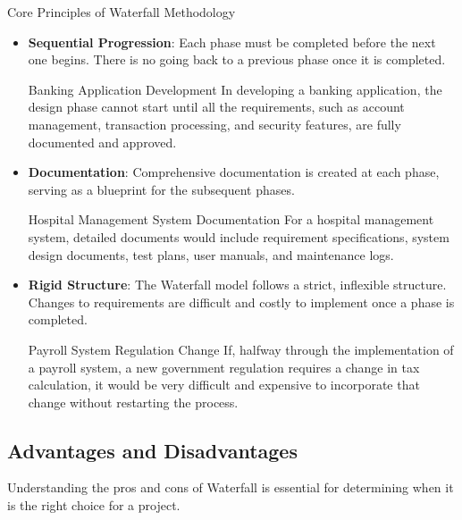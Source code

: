 \begin{conceptcard}{Core Principles of Waterfall Methodology}
  \begin{itemize}
    \item \textbf{Sequential Progression}: Each phase must be completed before the next one begins. There is no going back to a previous phase once it is completed.

          \begin{examplecard}{Banking Application Development}
            In developing a banking application, the design phase cannot start until all the requirements, such as account management, transaction processing, and security features, are fully documented and approved.
          \end{examplecard}

    \item \textbf{Documentation}: Comprehensive documentation is created at each phase, serving as a blueprint for the subsequent phases.

          \begin{examplecard}{Hospital Management System Documentation}
            For a hospital management system, detailed documents would include requirement specifications, system design documents, test plans, user manuals, and maintenance logs.
          \end{examplecard}

    \item \textbf{Rigid Structure}: The Waterfall model follows a strict, inflexible structure. Changes to requirements are difficult and costly to implement once a phase is completed.

          \begin{examplecard}{Payroll System Regulation Change}
            If, halfway through the implementation of a payroll system, a new government regulation requires a change in tax calculation, it would be very difficult and expensive to incorporate that change without restarting the process.
          \end{examplecard}
  \end{itemize}
\end{conceptcard}

\subsection{Advantages and Disadvantages}

Understanding the pros and cons of Waterfall is essential for determining when
it is the right choice for a project.

